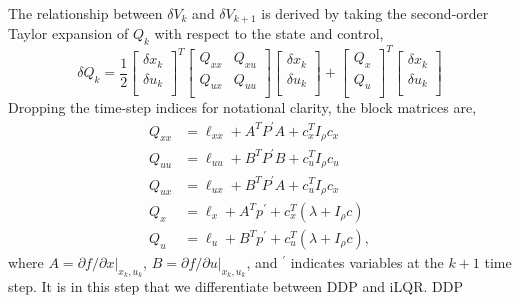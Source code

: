 \documentclass[../root.tex]{subfiles}
\begin{document}
    The relationship between $\delta V_k$ and $\delta V_{k+1}$ is derived by
    taking the second-order Taylor expansion of $Q_k$ with respect to the
    state and control,
    \begin{equation} \label{eq:Q_expansion}
        \delta Q_k = \frac{1}{2}
        \begin{bmatrix} \delta x_k \\ \delta u_k \\ \end{bmatrix}^T \!\!
        \begin{bmatrix} 
            Q_{xx} & Q_{xu} \\
            Q_{ux} & Q_{uu} \\
        \end{bmatrix}
        \begin{bmatrix} \delta x_k \\ \delta u_k \\ \end{bmatrix} + 
        \begin{bmatrix} Q_x \\ Q_u \\ \end{bmatrix}^T \!\!
        \begin{bmatrix} \delta x_k \\ \delta u_k \\ \end{bmatrix}
    \end{equation}
    Dropping the time-step indices for notational clarity, the block matrices are,
    \begin{subequations} \label{eq:Q_expansion_terms}
    \begin{align}
    Q_{xx} &= \ell_{xx} + A^T P^\prime A + c_x^T I_\rho c_x \label{Qxx_exp}\\
    Q_{uu} &= \ell_{uu} + B^T P^\prime B + c_u^T I_\rho c_u \label{Quu_exp}\\
    Q_{ux} &= \ell_{ux} + B^T P^\prime A + c_u^T I_\rho c_x \label{Qux_exp}\\
    Q_x &= \ell_x + A^T p^\prime + c_x^T(\lambda + I_\rho c) \label{Qx_exp}\\
    Q_u &= \ell_u + B^T p^\prime + c_u^T(\lambda + I_\rho c) \label{Qu_exp},
    \end{align}
    \end{subequations}
    where $A = \partial f/\partial x|_{x_k,u_k}$, $B = \partial f/\partial
    u|_{x_k,u_k}$, and $^\prime$ indicates variables at the $k+1$ time step.
    It is in this step that we differentiate between DDP and iLQR. DDP
\end{document}
